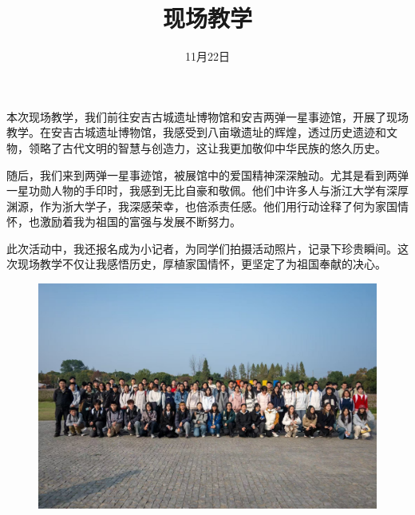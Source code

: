 \documentclass{./Paper}
\title{现场教学}
\date{11月22日}
\begin{document}
\maketitle

本次现场教学，我们前往安吉古城遗址博物馆和安吉两弹一星事迹馆，开展了现场教学。在安吉古城遗址博物馆，我感受到八亩墩遗址的辉煌，透过历史遗迹和文物，领略了古代文明的智慧与创造力，这让我更加敬仰中华民族的悠久历史。

随后，我们来到两弹一星事迹馆，被展馆中的爱国精神深深触动。尤其是看到两弹一星功勋人物的手印时，我感到无比自豪和敬佩。他们中许多人与浙江大学有深厚渊源，作为浙大学子，我深感荣幸，也倍添责任感。他们用行动诠释了何为家国情怀，也激励着我为祖国的富强与发展不断努力。

此次活动中，我还报名成为小记者，为同学们拍摄活动照片，记录下珍贵瞬间。这次现场教学不仅让我感悟历史，厚植家国情怀，更坚定了为祖国奉献的决心。
\begin{figure}[H]
    \centering
    \includegraphics[width = .7\textwidth]{./pic/微信图片_20241224002224.jpg}
\end{figure}
\end{document}
